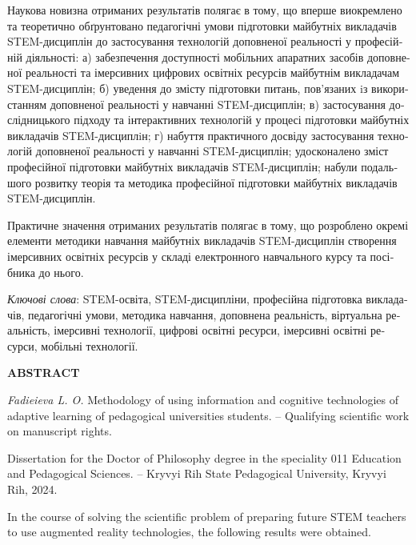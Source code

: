 {\begin{otherlanguage}{ukrainian}
{Наукова новизна отриманих результатів полягає в тому, що
    {вперше} 
    виокремлено та теоретично обґрунтовано
    педагогічні умови підготовки майбутніх викладачів STEM-дисцип\-лін до застосування технологій доповненої реальності у професійній діяльності: а)
   забезпечення доступності мобільних апаратних засобів доповненої реальності та імерсивних цифрових освітніх ресурсів майбутнім викладачам STEM-дисциплін; 
        б)
   уведення до змісту підготовки питань, пов'язаних iз використанням доповненої реальності у навчанні STEM-дисциплін; 
        в)
   застосування дослідницького підходу та інтерактивних технологій у процесі підготовки майбутніх викладачів STEM-дис\-цип\-лiн; 
        г)
   набуття практичного досвіду застосування технологій доповненої реальності у навчанні STEM-дисциплін;
    {удосконалено} зміст професійної підготовки майбутніх викладачів STEM-дис\-цип\-лін;
    {набули подальшого розвитку} теорія та методика професійної підготовки майбутніх викладачів STEM-дисциплін.
    

{Практичне значення отриманих результатів} полягає в тому, що розроблено окремі елементи методики навчання майбутніх викладачів STEM-дис\-цип\-лін створення імерсивних освітніх ресурсів у складі  електронного навчального курсу та посібника до нього. 



\textit{Ключові слова}: STEM-освіта, STEM-дисципліни, професійна підготовка викладачів, педагогічні умови,  методика навчання, доповнена реальність, віртуальна реальність, імерсивні технології, цифрові освітні ресурси, імерсивні освітні ресурси, мобільні технології.}

\end{otherlanguage}


\begin{center}
\large
    \textbf{ABSTRACT}
\end{center}

\textit{Fadieieva L. O.} Methodology of using information and cognitive technologies of adaptive learning of pedagogical universities students. -- Qualifying scientific work on manuscript rights.

Dissertation for the Doctor of Philosophy degree in the speciality 011 Education and Pedagogical Sciences. -- Kryvyi Rih State Pedagogical University, Kryvyi Rih, 2024.

{In the course of solving the scientific problem of preparing future STEM teachers to use augmented reality technologies, the following results were obtained. 

}}
